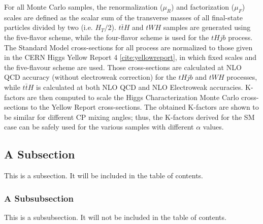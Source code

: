 For all Monte Carlo samples, the renormalization ($μ_{R}$) and factorization ($μ_{F}$) scales are defined as the scalar sum of the transverse masses of all final-state particles divided by two (i.e. $H_{T}/2$). $t\bar{t}H$ and $tWH$ samples are generated using the five-flavor scheme, while the four-flavor scheme is used for the $tHjb$ process. The Standard Model cross-sections for all process are normalized to those given in the CERN Higgs Yellow Report 4 \ref{cite:yellowreport}, in which fixed scales and the five-flavour scheme are used. Those cross-sections are calculated at NLO QCD accuracy (without electroweak correction) for the $tHjb$ and $tWH$ processes, while $t\bar{t}H$ is calculated at both NLO QCD and NLO Electroweak accuracies. K-factors are then computed to scale the Higgs Characterization Monte Carlo cross-sections to the Yellow Report cross-sections. The obtained K-factors are shown to be similar for different CP mixing angles; thus, the K-factors derived for the SM case can be safely used for the various samples with different $\alpha$ values.




\subsection{A Subsection} \label{sec:example_subsection} 

This is a subsection. It will be included in the table of contents. 

\subsubsection{A Subsubsection} \label{sec:example_subsubsection} 

This is a subsubsection. It will not be included in the table of contents. 

